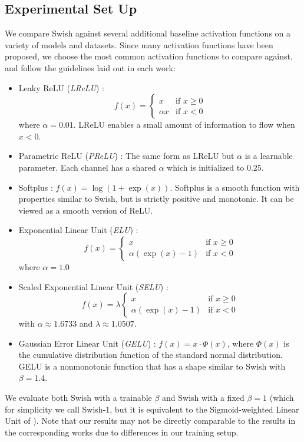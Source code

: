 \documentclass{article} %
\begin{document}
\subsection{Experimental Set Up}
\label{ssec:experiments-benchmarking}
We compare Swish against several additional baseline activation functions on a variety of models and datasets. Since many activation functions have been proposed, we choose the most common activation functions to compare against, and follow the guidelines laid out in each work:
\begin{itemize}
  \item Leaky ReLU (\emph{LReLU}) \citep{maas2013rectifier}: 
  $$
      f(x) = 
      \begin{cases}
        x           & \text{if } x \geq 0 \\
        \alpha x    & \text{if } x < 0
      \end{cases}
  $$
  where $\alpha = 0.01$. LReLU enables a small amount of information to flow when $x < 0$.
  \item Parametric ReLU (\emph{PReLU}) \citep{he2015delving}: The same form as LReLU but  $\alpha$ is a learnable parameter. Each channel has a shared $\alpha$ which is initialized to $0.25$.
  \item Softplus \citep{nair2010rectified}: $f(x) = \log(1 + \exp(x))$. Softplus is a smooth function with properties similar to Swish, but is strictly positive and monotonic. It can be viewed as a smooth version of ReLU.
  \item Exponential Linear Unit (\emph{ELU}) \citep{clevert2015fast}:
  $$
      f(x) = 
      \begin{cases}
        x                       & \text{if } x\geq 0 \\
        \alpha(\exp(x) - 1)     & \text{if } x < 0
      \end{cases}
  $$
  where $\alpha = 1.0$
  \item Scaled Exponential Linear Unit (\emph{SELU}) \citep{klambauer2017self}:
  $$
      f(x) = 
      \lambda \begin{cases}
        x                       & \text{if } x\geq 0 \\
        \alpha(\exp(x) - 1)     & \text{if } x < 0
      \end{cases}
  $$
  with $\alpha \approx 1.6733$ and $\lambda \approx 1.0507$.
  \item Gaussian Error Linear Unit (\emph{GELU}) \citep{hendrycks2016bridging}: $f(x) = x\cdot\Phi(x)$, where $\Phi(x)$ is the cumulative distribution function of the standard normal distribution. GELU is a nonmonotonic function that has a shape similar to Swish with $\beta=1.4$.
\end{itemize}
We evaluate both Swish with a trainable $\beta$ and Swish with a fixed $\beta = 1$ (which for simplicity we call Swish-1, but it is equivalent to the Sigmoid-weighted Linear Unit of \citet{elfwing2017sigmoid}). Note that our results may not be directly comparable to the results in the corresponding works due to differences in our training setup.
\end{document}
